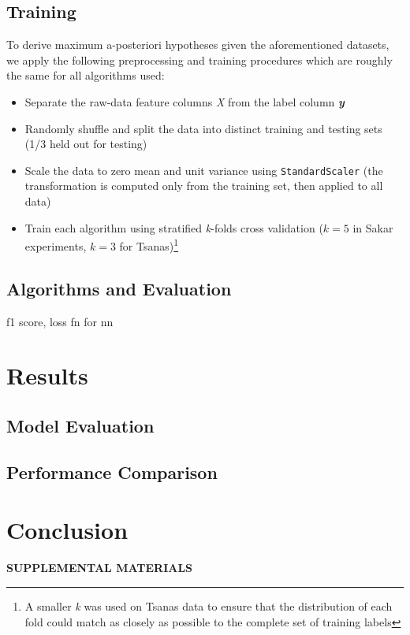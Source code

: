 \documentclass[12pt]{article}
\begin{document}
\subsection{Training}
To derive maximum a-posteriori hypotheses given the aforementioned datasets, we apply the following preprocessing and training procedures which are roughly the same for all algorithms used:
\begin{itemize}
  \item Separate the raw-data feature columns \textit{X} from the label column \textbf{\textit{y}}
  \item Randomly shuffle and split the data into distinct training and testing sets (1/3 held out for testing)
  \item Scale the data to zero mean and unit variance using \texttt{StandardScaler} (the transformation is computed only from the training set, then applied to all data)
  \item Train each algorithm using stratified \textit{k}-folds cross validation ($k=5$ in Sakar experiments, $k=3$ for Tsanas)\footnote{A smaller \textit{k} was used on Tsanas data to ensure that the distribution of each fold could match as closely as possible to the complete set of training labels}
\end{itemize}

\subsection{Algorithms and Evaluation}
f1 score, loss fn for nn
\section{Results}
\subsection{Model Evaluation}
\subsection{Performance Comparison}

\section{Conclusion}
\label{sec:conc}


\bigskip
\begin{center}
{\large\bf SUPPLEMENTAL MATERIALS}
\end{center}
\end{document}
